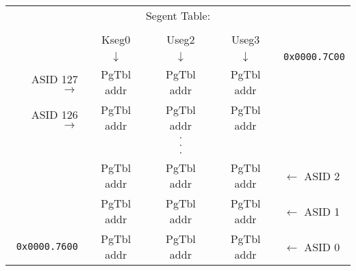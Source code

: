 \begin{tabular}{r|c|c|c|l}
\multicolumn{5}{c}{Segent Table:} \\
\multicolumn{5}{c}{}\\
\multicolumn{1}{c}{} & \multicolumn{1}{c}{Kseg0} & \multicolumn{1}{c}{Useg2} & \multicolumn{1}{c}{Useg3} & \multicolumn{1}{c}{} \\
\multicolumn{1}{c}{} & \multicolumn{1}{c}{$\downarrow$} & \multicolumn{1}{c}{$\downarrow$} & \multicolumn{1}{c}{$\downarrow$} & \multicolumn{1}{c}{\texttt{0x0000.7C00}} \\
\cline{2-4}
ASID 127 $\rightarrow$ & PgTbl addr & PgTbl addr & PgTbl addr & \\
\cline{2-4}
ASID 126 $\rightarrow$ & PgTbl addr & PgTbl addr & PgTbl addr & \\
\cline{2-4}
\multicolumn{1}{c}{} & \multicolumn{1}{c}{} & \multicolumn{1}{c}{$\cdot$} & \multicolumn{1}{c}{} & \multicolumn{1}{c}{} \\
\multicolumn{1}{c}{} & \multicolumn{1}{c}{} & \multicolumn{1}{c}{$\cdot$} & \multicolumn{1}{c}{} & \multicolumn{1}{c}{} \\
\multicolumn{1}{c}{} & \multicolumn{1}{c}{} & \multicolumn{1}{c}{$\cdot$} & \multicolumn{1}{c}{} & \multicolumn{1}{c}{} \\
\cline{2-4}
& PgTbl addr & PgTbl addr & PgTbl addr & $\leftarrow$ ASID 2 \\
\cline{2-4}
& PgTbl addr & PgTbl addr & PgTbl addr & $\leftarrow$ ASID 1 \\
\cline{2-4}
\texttt{0x0000.7600} & PgTbl addr & PgTbl addr & PgTbl addr & $\leftarrow$ ASID 0 \\
\cline{2-4}
\end{tabular}


